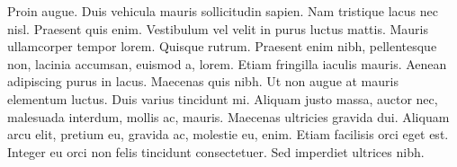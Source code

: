 \documentclass[tesis.tex]{subfiles}
\begin{document}
Proin augue. Duis vehicula mauris sollicitudin sapien. Nam tristique lacus
nec nisl. Praesent quis enim. Vestibulum vel velit in purus luctus mattis.
Mauris ullamcorper tempor lorem. Quisque rutrum. Praesent enim nibh,
pellentesque non, lacinia accumsan, euismod a, lorem. Etiam fringilla
iaculis mauris. Aenean adipiscing purus in lacus. Maecenas quis nibh. Ut
non augue at mauris elementum luctus. Duis varius tincidunt mi. Aliquam
justo massa, auctor nec, malesuada interdum, mollis ac, mauris. Maecenas
ultricies gravida dui. Aliquam arcu elit, pretium eu, gravida ac, molestie
eu, enim. Etiam facilisis orci eget est. Integer eu orci non felis tincidunt
consectetuer. Sed imperdiet ultrices nibh.
\end{document}
